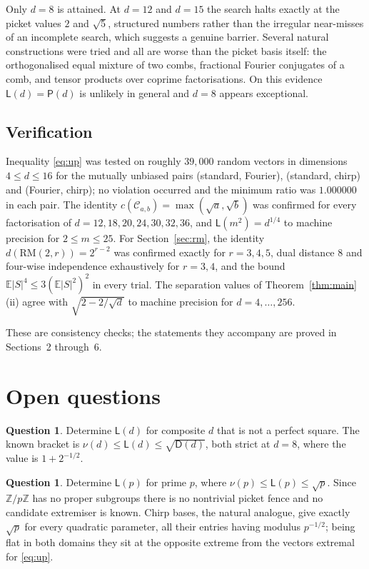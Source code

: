 \documentclass[11pt,reqno]{amsart}
\theoremstyle{plain}
\theoremstyle{definition}
\newtheorem{question}[theorem]{Question}
\theoremstyle{remark}
\newcommand{\Z}{\mathbb{Z}}
\newcommand{\Lb}{\mathsf{L}}
\newcommand{\Dd}{\mathsf{D}}
\newcommand{\Pp}{\mathsf{P}}
\newcommand{\RM}{\mathrm{RM}}
\begin{document}
Only $d=8$ is attained.  At $d=12$ and $d=15$ the search halts exactly
at the picket values $2$ and $\sqrt5$, structured numbers rather than
the irregular near-misses of an incomplete search, which suggests a
genuine barrier.  Several natural constructions were tried and all are
worse than the picket basis itself: the orthogonalised equal mixture of
two combs, fractional Fourier conjugates of a comb, and tensor products
over coprime factorisations.  On this evidence $\Lb(d)=\Pp(d)$ is
unlikely in general and $d=8$ appears exceptional.

\subsection{Verification}

Inequality \eqref{eq:up} was tested on roughly $39{,}000$ random vectors
in dimensions $4\le d\le16$ for the mutually unbiased pairs (standard,
Fourier), (standard, chirp) and (Fourier, chirp); no violation occurred
and the minimum ratio was $1.000000$ in each pair.  The identity
$c(\mathcal{C}_{a,b})=\max(\sqrt a,\sqrt b)$ was confirmed for every
factorisation of $d=12,18,20,24,30,32,36$, and $\Lb(m^2)=d^{1/4}$ to
machine precision for $2\le m\le25$.  For Section~\ref{sec:rm}, the
identity $d(\RM(2,r))=2^{r-2}$ was confirmed exactly for $r=3,4,5$, dual
distance $8$ and four-wise independence exhaustively for $r=3,4$, and
the bound $\mathbb{E}|S|^4\le3(\mathbb{E}|S|^2)^2$ in every trial.  The
separation values of Theorem~\ref{thm:main}(ii) agree with
$\sqrt{2-2/\sqrt d}$ to machine precision for $d=4,\ldots,256$.

These are consistency checks; the statements they accompany are proved
in Sections~2 through~6.

\section{Open questions}\label{sec:open}

\begin{question}
Determine $\Lb(d)$ for composite $d$ that is not a perfect square.  The
known bracket is $\nu(d)\le\Lb(d)\le\sqrt{\Dd(d)}$, both strict at
$d=8$, where the value is $1+2^{-1/2}$.
\end{question}

\begin{question}
Determine $\Lb(p)$ for prime $p$, where $\nu(p)\le\Lb(p)\le\sqrt p$.
Since $\Z/p\Z$ has no proper subgroups there is no nontrivial picket
fence and no candidate extremiser is known.  Chirp bases, the natural
analogue, give exactly $\sqrt p$ for every quadratic parameter, all
their entries having modulus $p^{-1/2}$; being flat in both domains they
sit at the opposite extreme from the vectors extremal for
\eqref{eq:up}.
\end{question}
\end{document}
